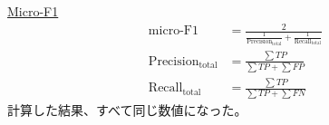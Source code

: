 \documentclass[leno,xcolor=dvipsnames]{beamer}
\begin{document}
  \begin{frame}{\href{https://ebi-works.com/macrof1/\#outline__1_2}{Micro-F1}}
    \begin{align*}
      \mathrm{micro\text{-}F1} &= \frac{2}{\frac{1}{\mathrm{Precision}_{\mathrm{total}}} + \frac{1}{\mathrm{Recall}_{\mathrm{total}}}} \\
      \mathrm{Precision}_{\mathrm{total}} &= \frac{\sum TP}{\sum TP + \sum FP} \\
      \mathrm{Recall}_{\mathrm{total}} &= \frac{\sum TP}{\sum TP + \sum FN}
    \end{align*}
    計算した結果、すべて同じ数値になった。
  \end{frame}
\end{document}
